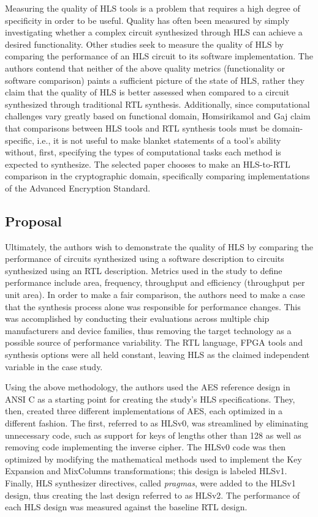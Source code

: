 \documentclass[12pt,journal,compsoc,onecolumn]{IEEEtran}
\begin{document}
Measuring the quality of HLS tools is a problem that requires a high degree of specificity in order to be useful. Quality has often been measured by simply investigating whether a complex circuit synthesized through HLS can achieve a desired functionality\cite{8}\cite{9}\cite{10}\cite{11}\cite{12}. Other studies \cite{3}\cite{4} seek to measure the quality of HLS by comparing the performance of an HLS circuit to its software implementation. The authors contend that neither of the above quality metrics (functionality or software comparison) paints a sufficient picture of the state of HLS, rather they claim that the quality of HLS is better assessed when compared to a circuit synthesized through traditional RTL synthesis. Additionally, since computational challenges vary greatly based on functional domain, Homsirikamol and Gaj claim that comparisons between HLS tools and RTL synthesis tools must be domain-specific, i.e., it is not useful to make blanket statements of a tool's ability without, first, specifying the types of computational tasks each method is expected to synthesize. The selected paper chooses to make an HLS-to-RTL comparison in the cryptographic domain, specifically comparing implementations of the Advanced Encryption Standard.

\subsection{Proposal}

Ultimately, the authors wish to demonstrate the quality of HLS by comparing the performance of circuits synthesized using a software description to circuits synthesized using an RTL description. Metrics used in the study to define performance include area, frequency, throughput and efficiency (throughput per unit area). In order to make a fair comparison, the authors need to make a case that the synthesis process alone was responsible for performance changes. This was accomplished by conducting their evaluations across multiple chip manufacturers and device families, thus removing the target technology as a possible source of performance variability. The RTL language, FPGA tools and synthesis options were all held constant, leaving HLS as the claimed independent variable in the case study. 

Using the above methodology, the authors used the AES reference design in ANSI C \cite{17} as a starting point for creating the study's HLS specifications. They, then, created three different implementations of AES, each optimized in a different fashion. The first, referred to as HLSv0, was streamlined by eliminating unnecessary code, such as support for keys of lengths other than 128 as well as removing code implementing the inverse cipher. The HLSv0 code was then optimized by modifying the mathematical methods used to implement the Key Expansion and MixColumns transformations; this design is labeled HLSv1. Finally, HLS synthesizer directives, called \emph{pragmas}, were added to the HLSv1 design, thus creating the last design referred to as HLSv2. The performance of each HLS design was measured against the baseline RTL design.
\end{document}
